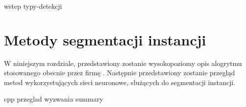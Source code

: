 {wstep}
{typy-detekcji}

\section{Metody segmentacji instancji}
\label{sec:metody_detekcji}

W niniejszym rozdziale, przedstawiony zostanie wysokopoziomy opis alogrytmu stosowanego obecnie przez firmę \blue{}. Następnie przedstawiony zostanie przegląd metod wykorzystujących sieci neuronowe, służących do segmentacji instancji.

{cpp}
{przeglad}
{wyzwania}
{summary}
